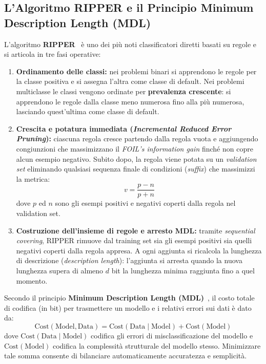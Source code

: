 \FloatBarrier
\subsection{L'Algoritmo RIPPER e il Principio Minimum Description Length (MDL)}
\label{subsec:dm-ripper-mdl}

L'algoritmo \textbf{RIPPER}~\cite{cohen1995} \`e uno dei pi\`u noti classificatori diretti basati su regole e si articola in tre fasi operative:
\begin{enumerate}
    \item \textbf{Ordinamento delle classi:} nei problemi binari si apprendono le regole per la classe positiva e si assegna l'altra come classe di default. Nei problemi multiclasse le classi vengono ordinate per \textbf{prevalenza crescente}: si apprendono le regole dalla classe meno numerosa fino alla pi\`u numerosa, lasciando quest'ultima come classe di default.
    \item \textbf{Crescita e potatura immediata (\textit{Incremental Reduced Error Pruning}):} ciascuna regola cresce partendo dalla regola vuota e aggiungendo congiunzioni che massimizzano il \textit{FOIL's information gain} finch\'e non copre alcun esempio negativo. Subito dopo, la regola viene potata su un \textit{validation set} eliminando qualsiasi sequenza finale di condizioni (\textit{suffix}) che massimizzi la metrica:
    \begin{equation}
        v = \frac{p - n}{p + n}
    \end{equation}
    dove $p$ ed $n$ sono gli esempi positivi e negativi coperti dalla regola nel validation set.
    \item \textbf{Costruzione dell'insieme di regole e arresto MDL:} tramite \textit{sequential covering}, RIPPER rimuove dal training set sia gli esempi positivi sia quelli negativi coperti dalla regola appresa. A ogni aggiunta si ricalcola la lunghezza di descrizione (\textit{description length}): l'aggiunta si arresta quando la nuova lunghezza supera di almeno $d$ bit la lunghezza minima raggiunta fino a quel momento.
\end{enumerate}

Secondo il principio \textbf{Minimum Description Length (MDL)}~\cite{rissanen1978}, il costo totale di codifica (in bit) per trasmettere un modello e i relativi errori sui dati \`e dato da:
\begin{equation}
    \text{Cost}(\text{Model}, \text{Data}) = \text{Cost}(\text{Data} \mid \text{Model}) + \text{Cost}(\text{Model})
\end{equation}
dove $\text{Cost}(\text{Data} \mid \text{Model})$ codifica gli errori di misclassificazione del modello e $\text{Cost}(\text{Model})$ codifica la complessit\`a strutturale del modello stesso. Minimizzare tale somma consente di bilanciare automaticamente accuratezza e semplicit\`a.

